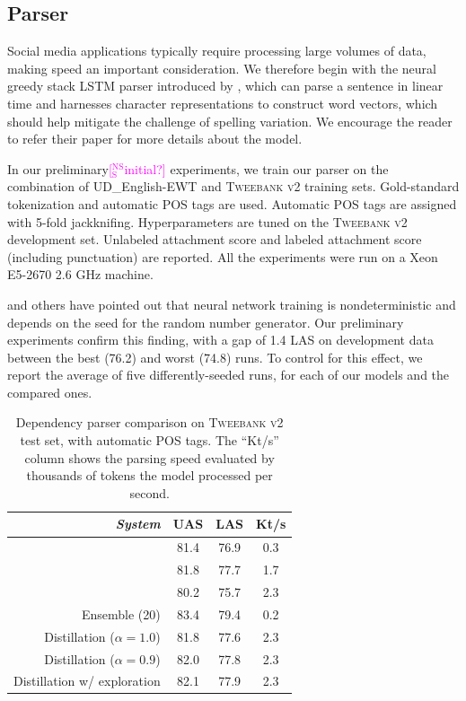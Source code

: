\documentclass[11pt,a4paper]{article}
\newcommand{\nss}[1]{\textcolor{magenta}{[$_\mathrm{S}^\mathrm{NS}$#1]}}
\begin{document}
\subsection{Parser}

Social media applications typically require processing large volumes
of data, making speed an important consideration. We therefore 
begin with the neural greedy stack LSTM parser introduced by ,
which can parse a sentence in linear time and harnesses 
character representations to construct word vectors, which should help mitigate the challenge of
spelling variation. We encourage the reader to refer their paper for
more details about the model.

In our preliminary\nss{initial?} experiments, we train our parser on the combination of UD\_English-EWT
and \textsc{Tweebank v2} training sets. Gold-standard tokenization and automatic POS
tags are used. Automatic POS tags are assigned with 5-fold
jackknifing. Hyperparameters %
are tuned on the \textsc{Tweebank v2} development set. Unlabeled attachment score and
labeled attachment score (including punctuation) are reported.
All the experiments were run on a Xeon E5-2670 2.6 GHz machine.

\citet{reimers-gurevych:2017:EMNLP2017} and others have
pointed out that neural network training is 
nondeterministic and depends on the seed for the random
number generator.
Our preliminary experiments confirm this finding, with a gap of 1.4 LAS on development data
between the best (76.2)
 and worst (74.8) runs. To control for this
effect, we report the average of five differently-seeded runs, for
each of our models and the compared ones.

\begin{table}[t]
	\centering
	\begin{tabular}{rccc}
		\it System & UAS & LAS & Kt/s \\
		\hline
		\citet{kong-EtAl:2014:EMNLP2014} & 81.4 & 76.9 & 0.3 \\
		\citet{dozat-qi-manning:2017:K17-3} & 81.8 & 77.7 & 1.7 \\
		\newcite{ballesteros-EtAl:2016:EMNLP2016} & 80.2 & 75.7 & 2.3 \\
		\hdashline
		Ensemble (20) & 83.4 & 79.4 & 0.2 \\
		Distillation ($\alpha =1.0$) & 81.8 & 77.6 & 2.3 \\
		Distillation ($\alpha =0.9$) & 82.0 & 77.8 & 2.3 \\		
		Distillation w/ exploration & 82.1 & 77.9 & 2.3 \\
	\end{tabular}
	\caption{Dependency parser comparison on \textsc{Tweebank v2} test set,
           with automatic POS tags. The ``Kt/s'' column shows
           the parsing speed evaluated by thousands of tokens
           the model processed per second.
            \label{tbl:parse-result}}
\end{table}
\end{document}
